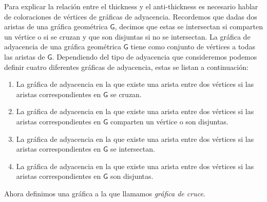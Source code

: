 
Para explicar la relación entre el thickness y el anti-thickness es necesario
hablar de coloraciones de vértices de gráficas de adyacencia. Recordemos que
dadas dos aristas de una gráfica geométrica $\mathsf{G}$, decimos que estas
se intersectan si comparten un vértice o si se cruzan y que son disjuntas
si no se intersectan. La gráfica de adyacencia de una gráfica geométrica
$\mathsf{G}$ tiene como conjunto de vértices a todas las aristas de
$\mathsf{G}$. Dependiendo del tipo de adyacencia que consideremos
podemos definir cuatro diferentes gráficas de adyacencia, estas se listan
a continuación:
\begin{enumerate}
  \item \label{itm:epp}La gráfica de adyacencia en la que existe una arista
  entre dos vértices si las aristas correspondientes en $\mathsf{G}$ se cruzan.
  \item  \label{itm:W} La gráfica de adyacencia en la que existe una arista
  entre dos vértices si las aristas correspondientes en $\mathsf{G}$ comparten
  un vértice o son disjuntas.
  \item  \label{itm:I} La gráfica de adyacencia en la que existe una arista
  entre dos vértices si las aristas correspondientes en $\mathsf{G}$ se
  intersectan.
  \item \label{itm:D}  La gráfica de adyacencia en la que existe una arista
  entre dos vértices si las aristas correspondientes en $\mathsf{G}$ son
  disjuntas.
\end{enumerate}

Ahora definimos una gráfica a la que llamamos \emph{gráfica de cruce}.

